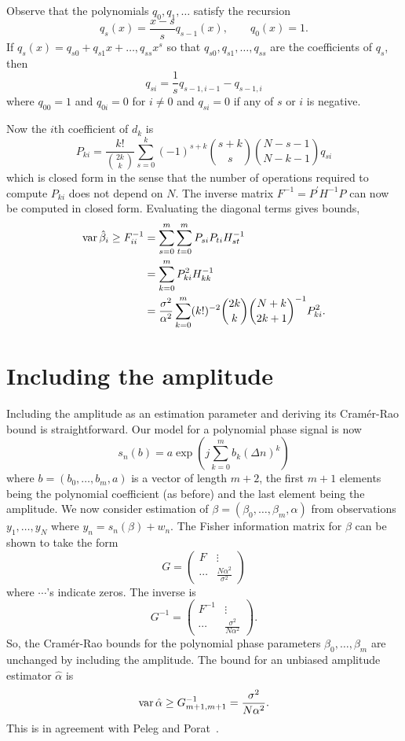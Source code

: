 \documentclass[journal,10pt]{IEEEtran}
\begin{document}
Observe that the polynomials $q_0,q_1,\dots$ satisfy the recursion
\[
q_s(x) = \frac{x-s}{s} q_{s-1}(x), \qquad q_{0}(x) = 1.
\]
If $q_s(x) = q_{s0} + q_{s1}x + \dots, q_{ss}x^s$ so that $q_{s0},q_{s1},\dots,q_{ss}$ are the coefficients of $q_{s}$, then
\[
q_{si} = \frac{1}{s}q_{s-1,i-1} - q_{s-1,i}
\]
where $q_{00}=1$ and $q_{0i}=0$ for $i \neq 0$ and $q_{si} = 0$ if any of $s$ or $i$ is negative.

Now the $i$th coefficient of $d_k$ is
\[
P_{ki} = \frac{k!}{\binom{2k}{k}}\sum_{s=0}^k{(-1)^{s+k}\binom{s+k}{s}\binom{N-s-1}{N-k-1}q_{si}}
\]  
which is closed form in the sense that the number of operations required to compute $P_{ki}$ does not depend on $N$.  The inverse matrix $F^{-1} = P^\prime H^{-1} P$ can now be computed in closed form.  Evaluating the diagonal terms gives bounds,
\begin{align*}
\operatorname{var} \hat{\beta}_i \geq F_{ii}^{-1} &=  \sum_{s=0}^{m}\sum_{t=0}^{m} P_{si} P_{ti}  H_{st}^{-1} \\
&=  \sum_{k=0}^{m} P_{ki}^2  H_{kk}^{-1} \\
&= \frac{\sigma^2}{\alpha^2} \sum_{k=0}^{m} (k!)^{-2} \binom{2k}{k} \binom{N+k}{2k+1}^{-1} P_{ki}^2.
\end{align*}
 

 

\section{Including the amplitude}\label{sec:including-amplitude}

Including the amplitude as an estimation parameter and deriving its Cram\'{e}r-Rao bound is straightforward.  Our model for a polynomial phase signal is now
\[
s_n(b) = a \exp\left( j \sum_{k = 0}^{m}{b_k (\Delta n)^k}\right)
\]
where $b=(b_0, \dots, b_m, a)$ is a vector of length $m+2$, the first $m+1$ elements being the polynomial coefficient (as before) and the last element being the amplitude.  We now consider estimation of $\beta = (\beta_0, \dots, \beta_m, \alpha)$ from observations $y_1, \dots, y_N$ where $y_n = s_n(\beta) + w_n$.  The Fisher information matrix for $\beta$ can be shown to take the form
\[
G = \left( \begin{array}{cc}
F & \vdots \\
\cdots & \frac{N\alpha^2}{\sigma^2}
\end{array}\right)
\]
where $\cdots$'s indicate zeros.  The inverse is
\[
G^{-1} = \left( \begin{array}{cc}
F^{-1} & \vdots \\
\cdots & \frac{\sigma^2}{N\alpha^2}
\end{array} \right).
\]
So, the Cram\'{e}r-Rao bounds for the polynomial phase parameters $\beta_0, \dots, \beta_m$ are unchanged by including the amplitude.  The bound for an unbiased amplitude estimator $\hat{\alpha}$ is
\[
\operatorname{var} \hat{\alpha} \geq G_{m+1,m+1}^{-1} = \frac{\sigma^2}{N\alpha^2}.
\]
This is in agreement with Peleg and Porat~\cite{Peleg1991_CRB_PPS_1991}.
\end{document}
